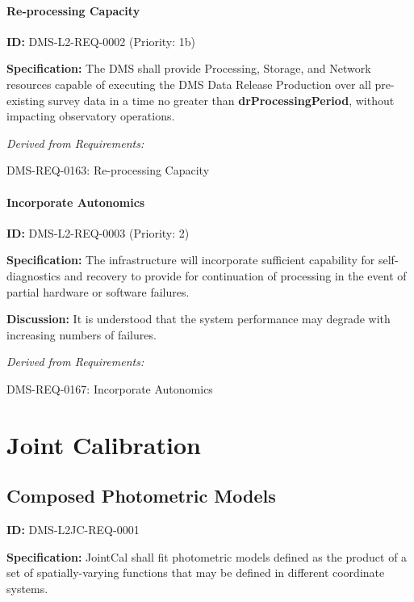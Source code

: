 \documentclass[SE,toc,lsstdraft]{lsstdoc}
\begin{document}
\paragraph{Re-processing Capacity}\hfill  %

\label{DMS-L2-REQ-0002}
\textbf{ID:} DMS-L2-REQ-0002 (Priority: 1b)

\textbf{Specification:} The DMS shall provide Processing, Storage, and Network resources capable of executing the DMS Data Release Production over all pre-existing survey data in a time no greater than \textbf{drProcessingPeriod}, without impacting observatory operations.

\emph{Derived from Requirements:}

DMS-REQ-0163:
Re-processing Capacity \newline

\paragraph{Incorporate Autonomics}\hfill  %

\label{DMS-L2-REQ-0003}
\textbf{ID:} DMS-L2-REQ-0003 (Priority: 2)

\textbf{Specification:} The infrastructure will incorporate sufficient capability for self-diagnostics and recovery to provide for continuation of processing in the event of partial hardware or software failures.

\textbf{Discussion: }It is understood that the system performance may degrade with increasing numbers of failures.

\emph{Derived from Requirements:}

DMS-REQ-0167:
Incorporate Autonomics \newline

\section{Joint Calibration}

\subsection{Composed Photometric Models}

\label{DMS-L2JC-REQ-0001}
\textbf{ID:} DMS-L2JC-REQ-0001

\textbf{Specification:}
JointCal shall fit photometric models defined as the product of a set of spatially-varying functions that may be defined in different coordinate systems.
\end{document}

